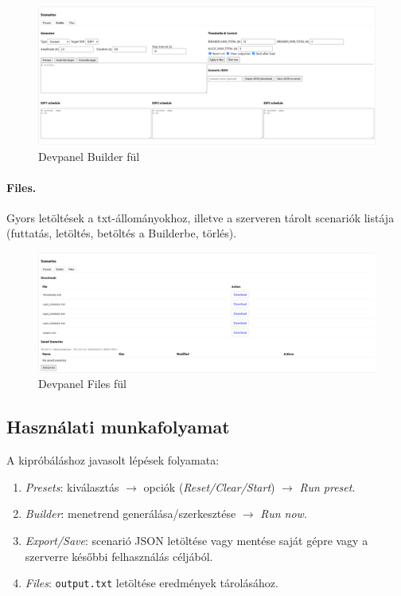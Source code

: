 \begin{figure}[H]
    \centering
    \includegraphics[width=1\textwidth]{figures/devpanel builder.png}
    \caption{Devpanel Builder fül}
    \label{fig:devpanel builder}
\end{figure}

\paragraph{Files.} Gyors letöltések a txt-állományokhoz, illetve a szerveren tárolt 
scenariók listája (futtatás, letöltés, betöltés a Builderbe, törlés).

\begin{figure}[H]
    \centering
    \includegraphics[width=1\textwidth]{figures/devpanel_files.png}
    \caption{Devpanel Files fül}
    \label{fig:devpanel}
\end{figure}

\subsection{Használati munkafolyamat}
A kipróbáláshoz javasolt lépések folyamata:
\begin{enumerate}
  \item \emph{Presets}: kiválasztás \(\rightarrow\) opciók 
  (\emph{Reset/Clear/Start}) \(\rightarrow\) \emph{Run preset}.
  \item \emph{Builder}: menetrend generálása/szerkesztése 
  \(\rightarrow\) \emph{Run now}.
  \item \emph{Export/Save}: scenarió JSON letöltése vagy mentése saját gépre vagy a szerverre 
  későbbi felhasználás céljából.
  \item \emph{Files}: \texttt{output.txt} letöltése eredmények tárolásához.
\end{enumerate}